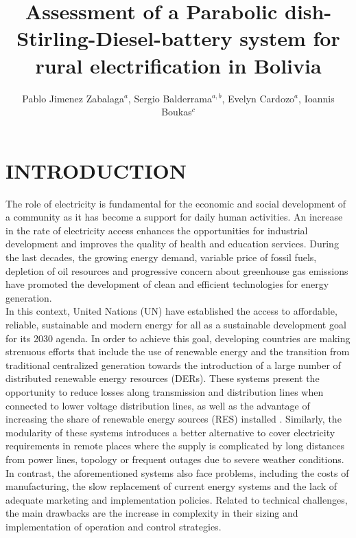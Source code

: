 \documentclass{ECOS_2019}
\title{Assessment of a Parabolic dish-Stirling-Diesel-battery system for rural electrification in Bolivia}
\author{Pablo Jimenez Zabalaga$^{a}$, Sergio Balderrama$^{a,b}$, Evelyn Cardozo$^{a}$, Ioannis Boukas$^{c}$}
\begin{document}
\newpage
\section{INTRODUCTION}
The role of electricity is fundamental for the economic and social development of a community as it has become a support for daily human activities. An increase in the rate of electricity access enhances the opportunities for industrial development and improves the quality of health and education services\cite{WorldBank}. During the last decades, the growing energy demand, variable price of fossil fuels, depletion of oil resources and progressive concern about greenhouse gas emissions have promoted the development of clean and efficient technologies for energy generation\cite{Essa2020,Salehi2020,Wies2012}.\\
In this context, United Nations (UN) have established the access to affordable, reliable, sustainable and modern energy for all as a sustainable development goal for its 2030 agenda\cite{Nerini2018}. In order to achieve this goal, developing countries are making strenuous efforts that include the use of renewable energy and the transition from traditional centralized generation towards the introduction of a large number of distributed renewable energy resources (DERs). These systems present the opportunity to reduce losses along transmission and distribution lines when connected to lower voltage distribution lines, as well as the advantage of increasing the share of renewable energy sources (RES) installed \cite{Colombo2013}. Similarly, the modularity of these systems introduces a better alternative to cover electricity requirements in remote places where the supply is complicated by long distances from power lines, topology or frequent outages due to severe weather conditions\cite{ElBassam,Chowdhury2009}. In contrast, the aforementioned systems also face problems, including the costs of manufacturing, the slow replacement of current energy systems and the lack of adequate marketing and implementation policies\cite{Chu2012}. Related to technical challenges, the main drawbacks are the increase in complexity in their sizing and implementation of operation and control strategies\cite{Rekioua2019}.\\
\end{document}
